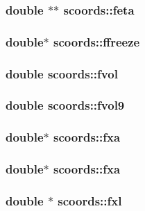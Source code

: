 \subsubsection{\setlength{\rightskip}{0pt plus 5cm}double $\ast$$\ast$ {\bf scoords::feta}}\label{structscoords_98c3b9dc064f74672c2891f0e4f75935}


\subsubsection{\setlength{\rightskip}{0pt plus 5cm}double$\ast$ {\bf scoords::ffreeze}}\label{structscoords_2399e7d0528d8f554aeb8974453bff5d}


\subsubsection{\setlength{\rightskip}{0pt plus 5cm}double {\bf scoords::fvol}}\label{structscoords_8e72d827c368354be4f291e9c2371e24}


\subsubsection{\setlength{\rightskip}{0pt plus 5cm}double {\bf scoords::fvol9}}\label{structscoords_3de1f76b9721eb153137d7b40a3b53e6}


\subsubsection{\setlength{\rightskip}{0pt plus 5cm}double$\ast$ {\bf scoords::fxa}}\label{structscoords_e4161bbf5b6b0e75a9f34baeed21bfc1}


\subsubsection{\setlength{\rightskip}{0pt plus 5cm}double$\ast$ {\bf scoords::fxa}}\label{structscoords_e4161bbf5b6b0e75a9f34baeed21bfc1}


\subsubsection{\setlength{\rightskip}{0pt plus 5cm}double $\ast$ {\bf scoords::fxl}}\label{structscoords_ab8491d347dd135bdb140ba3f0480885}


